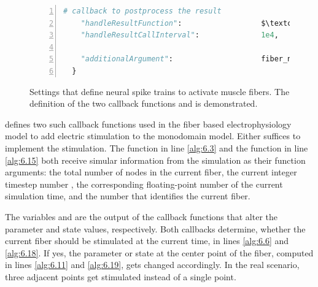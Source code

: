 \begin{figure}
\begin{framed}
\begin{lstlisting}[basicstyle=\footnotesize\ttfamily,commentstyle=\color{gray},numbers=left,language=python]
    # callback to postprocess the result
    "handleResultFunction":                  $\textcolor{Maroon}{\text{\ttfamily handle\_result}}$,    $\label{alg:6.41}$
    "handleResultCallInterval":              1e4,         
     
    "additionalArgument":                    fiber_no,        $\label{alg:6.43}$
  }

\end{lstlisting}
\end{framed}
\caption{Settings that define neural spike trains to activate muscle fibers. The definition of the two callback functions  and  is demonstrated.}%
\label{fig:example_callback_functions}%
\end{figure}

 defines two such callback functions used in the fiber based electrophysiology model to add electric stimulation to the monodomain model. Either suffices to implement the stimulation. The function  in line \ref{alg:6.3} and the function  in line \ref{alg:6.15} both receive simular information from the simulation as their function arguments: the total number  of nodes in the current fiber, the current integer timestep number , the corresponding floating-point number  of the current simulation time, and the number  that identifies the current fiber.

The variables  and  are the output of the callback functions that alter the parameter and state values, respectively. Both callbacks determine, whether the current fiber should be stimulated at the current time, in lines \ref{alg:6.6} and \ref{alg:6.18}.
If yes, the parameter or state at the center point of the fiber, computed in lines \ref{alg:6.11} and \ref{alg:6.19}, gets changed accordingly. In the real scenario, three adjacent points get stimulated instead of a single point.

